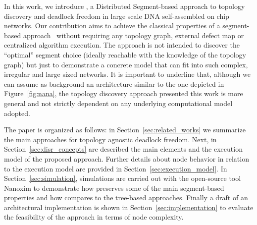 In this work, we introduce \disr{}, a Distributed Segment-based
approach to topology discovery and deadlock freedom in large scale DNA
self-assembled on chip networks. Our contribution aims to achieve the
classical properties of a segment-based approach~\cite{mejia_ipdps06}
without requiring any topology graph, external defect map or
centralized algorithm execution.  The \disr{} approach is not
intended to discover the ``optimal'' segment choice (ideally reachable
with the knowledge of the topology graph) but just to demonstrate a
concrete model that can fit into such complex, irregular and large
sized networks. It is important to underline that, although we can
assume as background an architecture similar to the one depicted in
Figure~\ref{fig:nana}, the \disr{} topology discovery
approach presented this work is more general and not strictly
dependent on any underlying computational model adopted.

The paper is organized as follows: in Section~\ref{sec:related_works}
we summarize the main approaches for topology agnostic deadlock
freedom. Next, in
Section~\ref{sec:disr_concepts} are described the main elements and
the execution model of the proposed approach. Further details about node behavior
in relation to the execution model are provided in Section~\ref{sec:execution_model}. 
In Section~\ref{sec:simulation},
simulations are carried out with the open-source tool Nanoxim to
demonstrate how \disr{} preserves some of the main segment-based
properties and how compares to the tree-based approaches. Finally a
draft of an architectural implementation is shown in
Section~\ref{sec:implementation} to evaluate the feasibility of the
approach in terms of node complexity.

